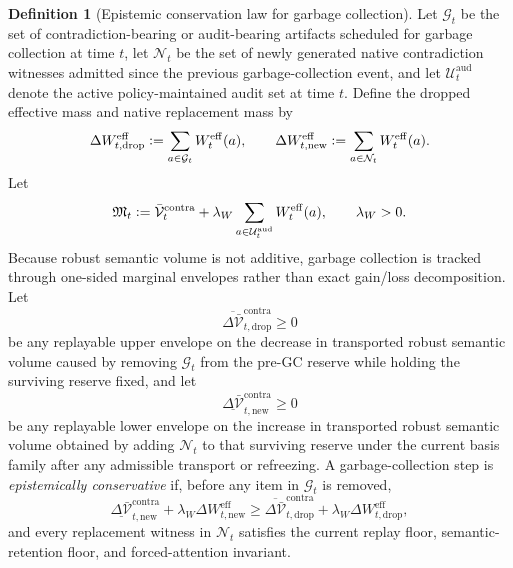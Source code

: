 \documentclass[11pt]{article}
\theoremstyle{definition}
\newtheorem{definition}[theorem]{Definition}
\newcommand{\1}{\mathbf{1}}
\newcommand{\Defeq}{\vcentcolon=}
\begin{document}
\begin{definition}[Epistemic conservation law for garbage collection]
\label{def:epistemic_conservation}
Let $\mathcal G_t$ be the set of contradiction-bearing or audit-bearing artifacts scheduled for garbage collection at time $t$, let $\mathcal N_t$ be the set of newly generated native contradiction witnesses admitted since the previous garbage-collection event, and let $\mathcal U_t^{\mathrm{aud}}$ denote the active policy-maintained audit set at time $t$. Define the dropped effective mass and native replacement mass by
\[
\Delta W_{t,\mathrm{drop}}^{\mathrm{eff}}\Defeq \sum_{a\in\mathcal G_t} W_t^{\mathrm{eff}}(a),
\qquad
\Delta W_{t,\mathrm{new}}^{\mathrm{eff}}\Defeq \sum_{a\in\mathcal N_t} W_t^{\mathrm{eff}}(a).
\]
Let
\[
\mathfrak M_t \Defeq \bar{\mathcal V}_t^{\mathrm{contra}} + \lambda_W \sum_{a\in\mathcal U_t^{\mathrm{aud}}} W_t^{\mathrm{eff}}(a),
\qquad \lambda_W>0.
\]
Because robust semantic volume is not additive, garbage collection is tracked through one-sided marginal envelopes rather than exact gain/loss decomposition. Let
\[
\overline{\Delta \bar{\mathcal V}}_{t,\mathrm{drop}}^{\mathrm{contra}}\ge 0
\]
be any replayable upper envelope on the decrease in transported robust semantic volume caused by removing $\mathcal G_t$ from the pre-GC reserve while holding the surviving reserve fixed, and let
\[
\underline{\Delta \bar{\mathcal V}}_{t,\mathrm{new}}^{\mathrm{contra}}\ge 0
\]
be any replayable lower envelope on the increase in transported robust semantic volume obtained by adding $\mathcal N_t$ to that surviving reserve under the current basis family after any admissible transport or refreezing. A garbage-collection step is \emph{epistemically conservative} if, before any item in $\mathcal G_t$ is removed,
\[
\underline{\Delta \bar{\mathcal V}}_{t,\mathrm{new}}^{\mathrm{contra}} + \lambda_W\Delta W_{t,\mathrm{new}}^{\mathrm{eff}}
\ge
\overline{\Delta \bar{\mathcal V}}_{t,\mathrm{drop}}^{\mathrm{contra}} + \lambda_W\Delta W_{t,\mathrm{drop}}^{\mathrm{eff}},
\]
and every replacement witness in $\mathcal N_t$ satisfies the current replay floor, semantic-retention floor, and forced-attention invariant.
\end{definition}
\end{document}
